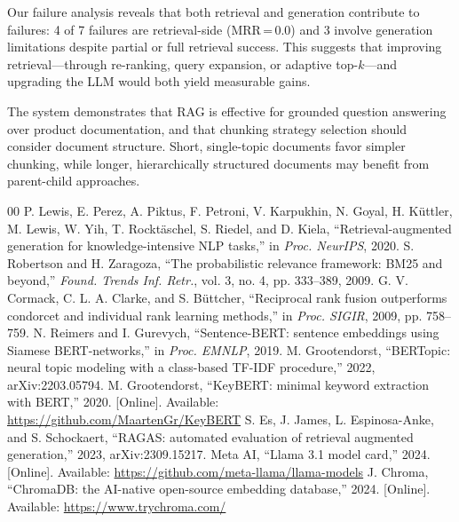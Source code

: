 \documentclass[conference]{IEEEtran}
\begin{document}
Our failure analysis reveals that both retrieval and generation contribute to failures: 4 of 7 failures are retrieval-side (MRR\,=\,0.0) and 3 involve generation limitations despite partial or full retrieval success. This suggests that improving retrieval---through re-ranking, query expansion, or adaptive top-$k$---and upgrading the LLM would both yield measurable gains.

The system demonstrates that RAG is effective for grounded question answering over product documentation, and that chunking strategy selection should consider document structure. Short, single-topic documents favor simpler chunking, while longer, hierarchically structured documents may benefit from parent-child approaches.

\begin{thebibliography}{00}
 P. Lewis, E. Perez, A. Piktus, F. Petroni, V. Karpukhin, N. Goyal, H. K\"{u}ttler, M. Lewis, W. Yih, T. Rockt\"{a}schel, S. Riedel, and D. Kiela, ``Retrieval-augmented generation for knowledge-intensive NLP tasks,'' in \textit{Proc. NeurIPS}, 2020.
 S. Robertson and H. Zaragoza, ``The probabilistic relevance framework: BM25 and beyond,'' \textit{Found. Trends Inf. Retr.}, vol. 3, no. 4, pp. 333--389, 2009.
 G. V. Cormack, C. L. A. Clarke, and S. B\"{u}ttcher, ``Reciprocal rank fusion outperforms condorcet and individual rank learning methods,'' in \textit{Proc. SIGIR}, 2009, pp. 758--759.
 N. Reimers and I. Gurevych, ``Sentence-BERT: sentence embeddings using Siamese BERT-networks,'' in \textit{Proc. EMNLP}, 2019.
 M. Grootendorst, ``BERTopic: neural topic modeling with a class-based TF-IDF procedure,'' 2022, arXiv:2203.05794.
 M. Grootendorst, ``KeyBERT: minimal keyword extraction with BERT,'' 2020. [Online]. Available: \url{https://github.com/MaartenGr/KeyBERT}
 S. Es, J. James, L. Espinosa-Anke, and S. Schockaert, ``RAGAS: automated evaluation of retrieval augmented generation,'' 2023, arXiv:2309.15217.
 Meta AI, ``Llama 3.1 model card,'' 2024. [Online]. Available: \url{https://github.com/meta-llama/llama-models}
 J. Chroma, ``ChromaDB: the AI-native open-source embedding database,'' 2024. [Online]. Available: \url{https://www.trychroma.com/}
\end{thebibliography}
\end{document}
